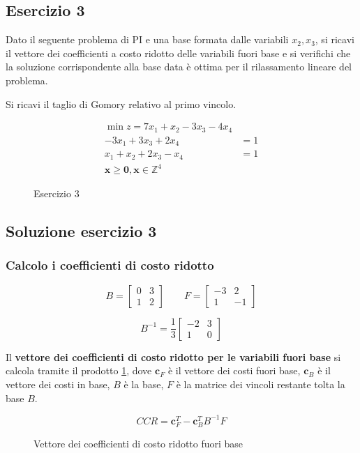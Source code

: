 \documentclass[\main/main.tex]{subfiles}
\begin{document}
\subsection{Esercizio 3}
Dato il seguente problema di PI e una base formata dalle variabili $x_2, x_3$, si ricavi il vettore dei coefficienti a costo ridotto delle variabili fuori base e si verifichi che la soluzione corrispondente alla base data è ottima per il rilassamento lineare del problema.

Si ricavi il taglio di Gomory relativo al primo vincolo.

\begin{figure}
  \begin{align*}
    \min z = 7x_1 + x_2 -3x_3 -4x_4 \\
    -3x_1 + 3x_3 +2x_4    & =1      \\
    x_1 + x_2 + 2x_3 -x_4 & =1      \\
    \bm{x}\geq \bm{0}, \bm{x} \in \mathbb{Z}^4
  \end{align*}
  \caption{Esercizio 3}
\end{figure}

\subsection{Soluzione esercizio 3}

\subsubsection*{Calcolo i coefficienti di costo ridotto}
\[
  B = \begin{bmatrix}
    0 & 3 \\
    1 & 2
  \end{bmatrix}
  \qquad
  F = \begin{bmatrix}
    -3 & 2  \\
    1  & -1
  \end{bmatrix}
\]

\[
  B^{-1} = \frac{1}{3} \begin{bmatrix}
    -2 & 3 \\
    1  & 0
  \end{bmatrix}
\]

\begin{definition}
  Il \textbf{vettore dei coefficienti di costo ridotto per le variabili fuori base} si calcola tramite il prodotto \ref{vccr}, dove $\bm{c}_F$ è il vettore dei costi fuori base, $\bm{c}_B$ è il vettore dei costi in base, $B$ è la base, $F$ è la matrice dei vincoli restante tolta la base $B$.
  \begin{figure}
    \[
      CCR = \bm{c}_F^T - \bm{c}_B^T B^{-1} F
    \]
    \caption{Vettore dei coefficienti di costo ridotto fuori base}
    \label{vccr}
  \end{figure}
\end{definition}
\end{document}
